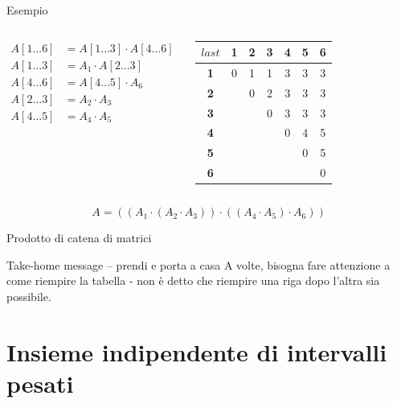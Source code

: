 \begin{frame}{Esempio}

\begin{columns}[T]
\begin{align*}
A[1 \ldots 6] &= A[1 \ldots 3] \cdot A[4 \ldots 6] \\
A[1 \ldots 3] &= A_1 \cdot A[2 \ldots 3]\\
A[4 \ldots 6] &= A[4 \ldots 5] \cdot A_6\\
A[2 \ldots 3] &= A_2 \cdot A_3 \\
A[4 \ldots 5] &= A_4 \cdot A_5
\end{align*}

\begin{tabular}{|c|c|c|c|c|c|c|}
\hline
$\mathit{last}$ &  \textbf{1} & \textbf{2} & \textbf{3} & \textbf{4} & \textbf{5} & \textbf{6} \\\hline
\textbf{1} & 0 & 1 & 1 & 3 & 3 & 3 \\\hline
\textbf{2} &   & 0 & 2 & 3 & 3 & 3 \\\hline
\textbf{3} &   &   & 0 & 3 & 3 & 3 \\\hline
\textbf{4} &   &   &   & 0 & 4 & 5 \\\hline
\textbf{5} &   &   &   &   & 0 & 5 \\\hline
\textbf{6} &   &   &   &   &   & 0 \\\hline
\end{tabular}
\end{columns}

\bigskip
{}

\[
 A = ( ( A_1 \cdot  (A_2 \cdot A_3) ) \cdot ( (A_4 \cdot A_5 )  \cdot A_6) )
\]

\end{frame}

\begin{frame}{Prodotto di catena di matrici}

\vspace{-6pt}
\begin{block}{Take-home message -- prendi e porta a casa}
A volte, bisogna fare attenzione a come riempire la tabella - non è detto che 
riempire una riga dopo l'altra sia possibile.
\end{block}

\end{frame}

\section{Insieme indipendente di intervalli pesati}


